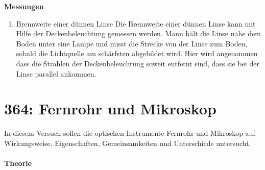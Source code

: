 \textbf{Messungen} 
\begin{enumerate}[label=--]
        \item Brennweite einer dünnen Linse \hspace{25pt}
                Die Brennweite einer dünnen Linse kann mit Hilfe der Deckenbeleuchtung gemessen werden.
                Mann hält die Linse nahe dem Boden unter eine Lampe und misst die Strecke von der Linse zum Boden, sobald die Lichtquelle am schärfsten abgebildet wird.
                Hier wird angenommen dass die Strahlen der Deckenbeleuchtung soweit entfernt sind, dass sie bei der Linse parallel ankommen.
\end{enumerate}

\newpage
\section{364: Fernrohr und Mikroskop}
In diesem Versuch sollen die optischen Instrumente Fernrohr und Mikroskop auf Wirkungsweise, Eigenschaften, Gemeinsamkeiten und Unterschiede untersucht.\\\\
\textbf{Theorie} 
